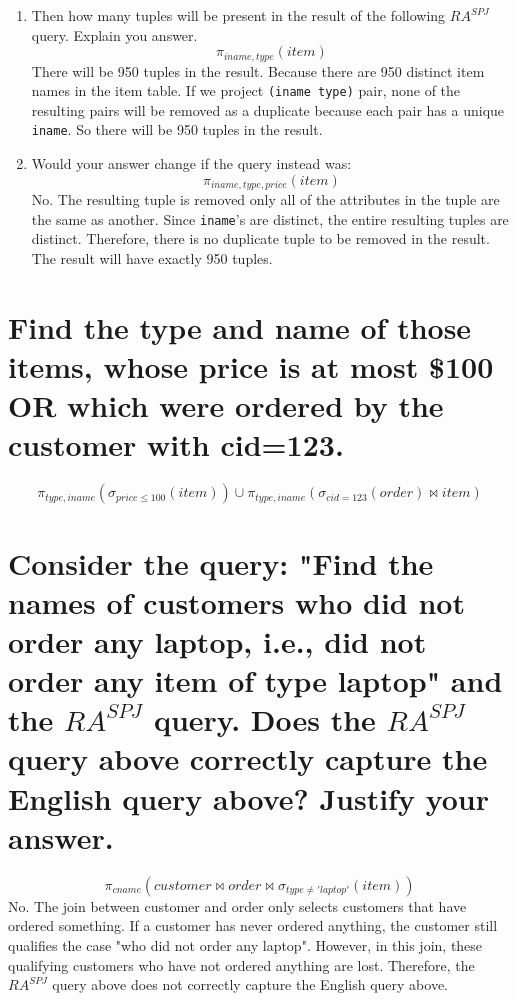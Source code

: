 \documentclass{article}
\begin{document}
\begin{enumerate}
\item  Then how many tuples will be present in the result of the following \(RA^{SPJ}\) query. Explain you answer.
\[
\pi_{iname, type}(item)
\]
There will be 950 tuples in the result. Because there are 950 distinct item names in the item table. If we project \texttt{(iname type)} pair, none of the resulting pairs will be removed as a duplicate because each pair has a unique \texttt{iname}. So there will be 950 tuples in the result.

\item Would your answer change if the query instead was:
\[
\pi_{iname, type, price}(item)
\]
No. The resulting tuple is removed only all of the attributes in the tuple are the same as another. Since \texttt{iname}'s are distinct, the entire resulting tuples are distinct. Therefore, there is no duplicate tuple to be removed in the result. The result will have exactly 950 tuples.

\end{enumerate}

\section{Find the type and name of those items, whose price is at most \$100 OR which were ordered
by the customer with cid=123.}
\[
\pi_{type, iname}(\sigma_{price \leq 100}(item)) \cup \pi_{type, iname}(\sigma_{cid=123}(order) \bowtie item)
\]

\section{Consider the query: "Find the names of customers who did not order any laptop, i.e., did not
order any item of type laptop" and the \(RA^{SPJ} \) query. Does the \(RA^{SPJ} \) query above correctly capture the English query above? Justify your answer.}
\[
\pi_{cname}(customer \bowtie order \bowtie \sigma_{type \neq 'laptop'}(item))
\]
No. The join between customer and order only selects customers that have ordered something. If a customer has never ordered anything, the customer still qualifies the case "who did not order any laptop". However, in this join, these qualifying customers who have not ordered anything are lost. Therefore, the \( RA^{SPJ} \) query above does not correctly capture the English query above.
\end{document}
